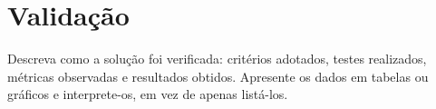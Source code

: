 \section{Validação}

Descreva como a solução foi verificada: critérios adotados, testes realizados,
métricas observadas e resultados obtidos. Apresente os dados em tabelas ou
gráficos e interprete-os, em vez de apenas listá-los.
